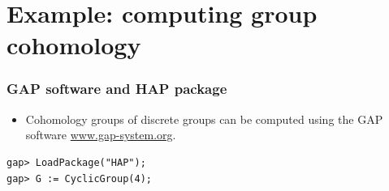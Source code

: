 \documentclass[xcolor=table, aspectratio=43,ignorenonframetext]{beamer}
\begin{document}
\section{Example: computing group cohomology}

\begin{frame}[fragile]
	\frametitle{GAP software and HAP package}
	\begin{itemize}
		\item Cohomology groups of discrete groups can be computed using the GAP software \url{www.gap-system.org}.
	\end{itemize}
	\begin{verbatim}
gap> LoadPackage("HAP");
gap> G := CyclicGroup(4);
	\end{verbatim}
\end{frame}
\end{document}
